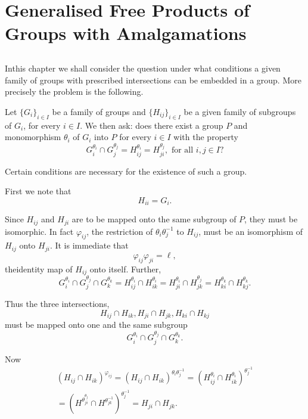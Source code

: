 
\chapter{Generalised Free Products of Groups with
  Amalgamations}\label{chap9} %

\section{}\label{chap9:sec1} %

In\pageoriginale this chapter we shall consider the question under what conditions a
given family of groups with prescribed intersections can be embedded
in a group. More precisely the problem is the following. 

Let $\big\{ G_i \big \}_{i \in I}$ be a family of groups and
$\big\{ H_{i j} \big \}_{i \in I}$ be a given family of
subgroups of $G_i$, for every $i \in I$. We then ask: does
there exist a group $P$ and monomorphism $\theta_i$ of $G_i$ into $P$
for every $i \in I$ with the property 
$$
G^{\theta_i}_i \cap G_j^{\theta_j} = H^{\theta_i}_{ij} =
H^{\theta_j}_{ji}, \text{ for all } i,j \in I? 
$$

Certain conditions are necessary for the existence of such a group.

First we note that 
$$
H_{i i} = G_i.
$$

Since $H_{ij}$ and $H_{ji}$ are to be mapped onto the same subgroup of
$P$, they must be isomorphic. In fact $\varphi_{ij}$, the restriction
of $\theta_i \theta_j^{-1}$ to $H_{ij}$, must be an isomorphism of
$H_{ij}$ onto $H_{ji}$. It is immediate that  
$$
\varphi_{ij} \varphi_{ji} = \ell,
$$
the\pageoriginale identity map of $H_{ij}$ onto itself. Further,
$$
G^{\theta_i}_i \cap G_j^{\theta_j} \cap G^{\theta_k}_k =
H^{\theta_i}_{ij} \cap H^{\theta_i}_{ik} = H^{\theta_i}_{ji} \cap
H^{\theta_j}_{jk} = H^{\theta_k}_{ki} \cap H^{\theta_k}_{kj}. 
$$

Thus the three intersections,
$$
H_{ij} \cap H_{ik}, H_{ji} \cap H_{jk}, H_{ki} \cap H_{kj}
$$
must be mapped onto one and the same subgroup
$$
G^{\theta_i}_i \cap G^{\theta_j}_j \cap G^{\theta_k}_k.
$$

Now
\begin{multline*}
  (H_{ij} \cap H_{ik})^{\varphi_{ij}} =(H_{ij} \cap H_{ik})^{\theta_i
    \theta^{-1}_j}= (H^{\theta_i}_{ij} \cap
  H^{\theta_i}_{ik})^{\theta^{-1}_j}\\ 
  = \left(H^{\theta_{ji}^{\theta_j}} \cap
  H^{\theta_{jk}^{-1}}\right)^{\theta_{j}^{-1}} =  H_{ji} \cap H_{jk}. 
\end{multline*}

